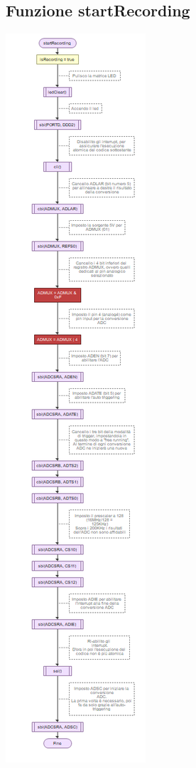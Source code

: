 \documentclass{article}
\begin{document}
\subsection{Funzione startRecording}
\includegraphics[scale=.50]{funStartRec.png}
\end{document}
